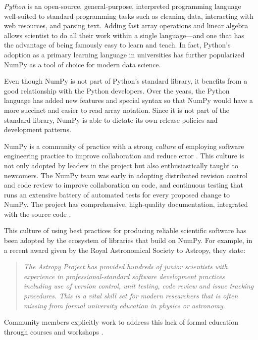\emph{Python} is an open-source, general-purpose, interpreted programming language
well-suited to standard programming tasks such as cleaning data,
interacting with web resources, and parsing text.
Adding fast array operations and linear algebra allows scientist to do all
their work within a single language---and one that has the advantage of
being famously easy to learn and teach.
In fact, Python's adoption as a primary learning language in universities
has further popularized NumPy as a tool of choice for modern data science.

Even though NumPy is not part of Python's standard library,
it benefits from a good relationship with the Python developers.
Over the years, the Python language has added new features and
special syntax so that NumPy would have a more succinct and 
easier to read array notation.
Since it is not part of the standard library, NumPy is able to
dictate its own release policies and development patterns.

NumPy is a community of practice with a strong \emph{culture} of
employing software engineering practice to improve collaboration and
reduce error \cite{millman2014developing}.  This culture is not only
adopted by leaders in the project but also enthusiastically taught to
newcomers. The NumPy team was early in adopting distributed revision
control and code review to improve collaboration on code, and
continuous testing that runs an extensive battery of automated tests for
every proposed change to NumPy.  The project has comprehensive,
high-quality documentation, integrated with the source
code \cite{vanderwalt2008scipy,harrington2008scipy,harrington2009scipy}.


This culture of using best practices for producing reliable scientific software
has been adopted by the ecosystem of libraries that build on NumPy.
For example, in a recent award given by the Royal Astronomical Society to
Astropy, they state:
\begin{quotation}
\noindent\emph{The Astropy Project has provided hundreds of junior scientists
with experience in professional-standard software development practices
including use of version control, unit testing, code review and issue tracking
procedures. This is a vital skill set for modern researchers that is often
missing from formal university education in physics or astronomy.}
\end{quotation}
Community members explicitly work to address this lack of formal education
through courses and workshops
\cite{wilson-software-carpentry,hannay-scientific-software-survey,millman2018teaching}.

